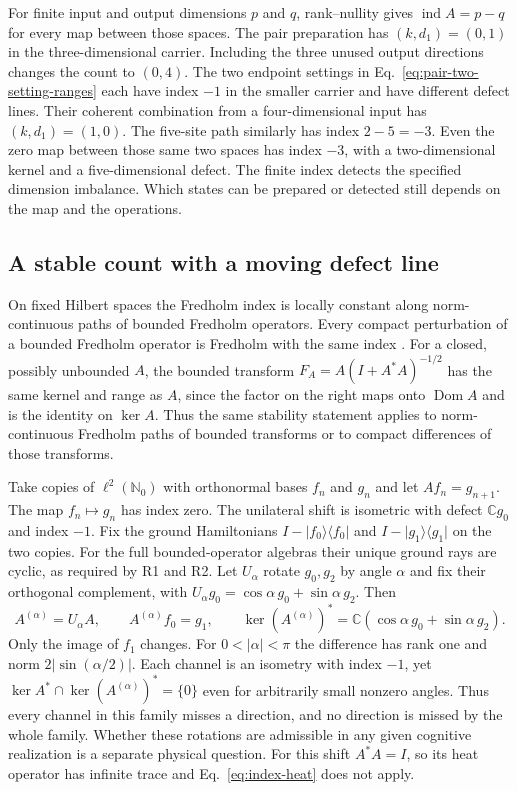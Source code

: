 \documentclass[11pt]{article}
\theoremstyle{definition}
\newcommand{\C}{\mathbb C}
\newcommand{\ket}[1]{\lvert #1\rangle}
\newcommand{\bra}[1]{\langle #1\rvert}
\begin{document}
For finite input and output dimensions $p$ and $q$, rank--nullity gives $\operatorname{ind}A=p-q$ for every map between those spaces. The pair preparation has $(k,d_1)=(0,1)$ in the three-dimensional carrier. Including the three unused output directions changes the count to $(0,4)$. The two endpoint settings in Eq.~\eqref{eq:pair-two-setting-ranges} each have index $-1$ in the smaller carrier and have different defect lines. Their coherent combination from a four-dimensional input has $(k,d_1)=(1,0)$. The five-site path similarly has index $2-5=-3$. Even the zero map between those same two spaces has index $-3$, with a two-dimensional kernel and a five-dimensional defect. The finite index detects the specified dimension imbalance. Which states can be prepared or detected still depends on the map and the operations.

\subsection{A stable count with a moving defect line}

On fixed Hilbert spaces the Fredholm index is locally constant along norm-continuous paths of bounded Fredholm operators. Every compact perturbation of a bounded Fredholm operator is Fredholm with the same index \cite[Chap.~IV]{Kato}. For a closed, possibly unbounded $A$, the bounded transform $F_A=A(I+A^*A)^{-1/2}$ has the same kernel and range as $A$, since the factor on the right maps onto $\operatorname{Dom}A$ and is the identity on $\ker A$. Thus the same stability statement applies to norm-continuous Fredholm paths of bounded transforms or to compact differences of those transforms.

Take copies of $\ell^2(\mathbb N_0)$ with orthonormal bases $f_n$ and $g_n$ and let $A f_n=g_{n+1}$. The map $f_n\mapsto g_n$ has index zero. The unilateral shift is isometric with defect $\C g_0$ and index $-1$. Fix the ground Hamiltonians $I-\ket{f_0}\bra{f_0}$ and $I-\ket{g_1}\bra{g_1}$ on the two copies. For the full bounded-operator algebras their unique ground rays are cyclic, as required by R1 and R2. Let $U_\alpha$ rotate $g_0,g_2$ by angle $\alpha$ and fix their orthogonal complement, with $U_\alpha g_0=\cos\alpha\,g_0+\sin\alpha\,g_2$. Then
\begin{equation}
 A^{(\alpha)}=U_\alpha A,\qquad A^{(\alpha)} f_0=g_1,\qquad
 \ker (A^{(\alpha)})^*=\C(\cos\alpha\,g_0+\sin\alpha\,g_2).
 \label{eq:index-shift-family}
\end{equation}
Only the image of $f_1$ changes. For $0<|\alpha|<\pi$ the difference has rank one and norm $2|\sin(\alpha/2)|$. Each channel is an isometry with index $-1$, yet $\ker A^*\cap\ker (A^{(\alpha)})^*=\{0\}$ even for arbitrarily small nonzero angles. Thus every channel in this family misses a direction, and no direction is missed by the whole family. Whether these rotations are admissible in any given cognitive realization is a separate physical question. For this shift $A^*A=I$, so its heat operator has infinite trace and Eq.~\eqref{eq:index-heat} does not apply.
\end{document}
